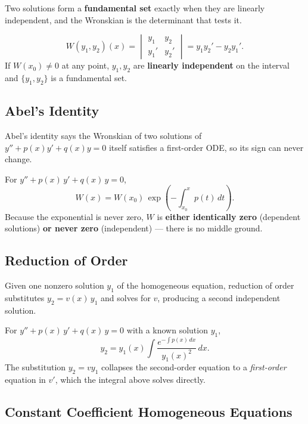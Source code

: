 Two solutions form a \textbf{fundamental set} exactly when they are linearly
independent, and the Wronskian is the determinant that tests it.

\begin{formulabox}
\[ W(y_1,y_2)(x) = \begin{vmatrix} y_1 & y_2 \\ y_1' & y_2' \end{vmatrix}
   = y_1 y_2' - y_2 y_1'. \]
If $W(x_0)\neq 0$ at any point, $y_1,y_2$ are \textbf{linearly independent} on the
interval and $\{y_1,y_2\}$ is a fundamental set.
\end{formulabox}

\subsection{Abel's Identity}

Abel's identity says the Wronskian of two solutions of
$y''+p(x)y'+q(x)y=0$ itself satisfies a first-order ODE, so its sign can never
change.

\begin{methodbox}
For $y'' + p(x)\,y' + q(x)\,y = 0$,
\[ W(x) = W(x_0)\,\exp\!\left(-\int_{x_0}^{x} p(t)\,dt\right). \]
Because the exponential is never zero, $W$ is \textbf{either identically zero}
(dependent solutions) \textbf{or never zero} (independent) --- there is no middle
ground.
\end{methodbox}

\subsection{Reduction of Order}

Given one nonzero solution $y_1$ of the homogeneous equation, reduction of order
substitutes $y_2 = v(x)\,y_1$ and solves for $v$, producing a second independent
solution.

\begin{methodbox}
For $y'' + p(x)\,y' + q(x)\,y = 0$ with a known solution $y_1$,
\[ y_2 = y_1(x)\int \frac{e^{-\int p(x)\,dx}}{y_1(x)^2}\,dx. \]
The substitution $y_2=v y_1$ collapses the second-order equation to a
\emph{first-order} equation in $v'$, which the integral above solves directly.
\end{methodbox}

\subsection{Constant Coefficient Homogeneous Equations}

